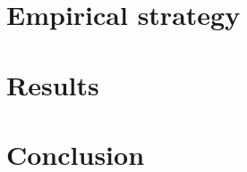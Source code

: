 \section{Empirical strategy}


\section{Results}


\section{Conclusion}



\clearpage
\printbibliography
\clearpage

%
%
%
% 


